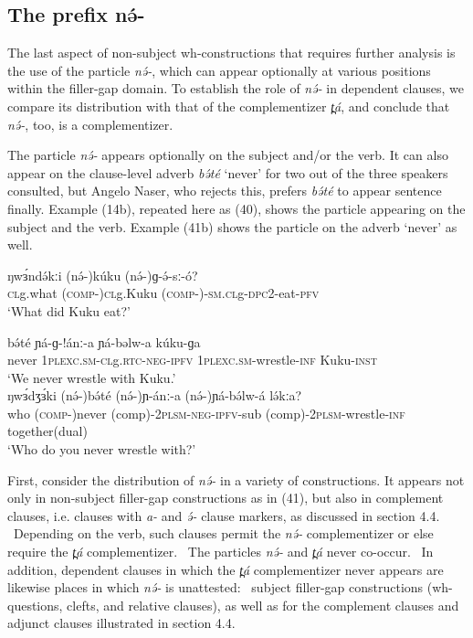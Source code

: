 \subsection{The prefix nə́-}
The last aspect of non-subject wh-constructions that requires further analysis is the use of the particle \textit{nə́-}, which can appear optionally at various positions within the filler-gap domain. To establish the role of \textit{nə́-} in dependent clauses, we compare its distribution with that of the complementizer \textit{t̪á}, and conclude that \textit{nə́-}, too, is a complementizer.

The particle \textit{nə́-} appears optionally on the subject and/or the verb. It can also appear on the clause-level adverb \textit{bə́té} ‘never’ for two out of the three speakers consulted, but Angelo Naser, who rejects this, prefers \textit{bə́té} to appear sentence finally. Example (14b), repeated here as (40), shows the particle appearing on the subject and the verb.  Example (41b) shows the particle on the adverb ‘never’ as well.

\ea
\gll	ŋwɜ́ndə́kːi	(nə́-)kúku	(nə́-)ɡ-ə́-sː-ó?\\
	\textsc{cl}g.what	(\textsc{comp-})\textsc{cl}g.Kuku	(\textsc{comp-})-\textsc{sm.cl}g-\textsc{dpc}2-eat-\textsc{pfv}	\\
\trans	‘What did Kuku eat?’\\
\z

\ea
\ea \gll	bə́té	ɲá-ɡ-!ánː-a	ɲá-bəlw-a          	kúku-ɡa\\
	never   1\textsc{plexc.sm}-\textsc{cl}g.\textsc{rtc}-\textsc{neg}-\textsc{ipfv} 1\textsc{plexc.sm}-wrestle-\textsc{inf}	Kuku-\textsc{inst}\\
\trans		‘We never wrestle with Kuku.’\\
\ex \gll	ŋwɜ́dʒɜ́ki	(nə́-)bə́té	(nə́-)ɲ-ánː-a	 (nə́-)ɲá-bə́lw-á	lə́kːa?  	   \\
		    	who	        (\textsc{comp-})never     (comp)-2\textsc{plsm}-\textsc{neg}-\textsc{ipfv}-sub	
			(comp)-2\textsc{plsm}-wrestle-\textsc{inf}	together(dual)\\
\trans		‘Who do you never wrestle with?’
\z
\z

First, consider the distribution of \textit{nə́-} in a variety of constructions. It appears not only in non-subject filler-gap constructions as in (41), but also in complement clauses, i.e. clauses with \textit{a-} and \textit{ə́-} clause markers, as discussed in section 4.4.  Depending on the verb, such clauses permit the \textit{nə́-} complementizer or else require the \textit{t̪á} complementizer.  The particles \textit{nə́-} and \textit{t̪á} never co-occur.  In addition, dependent clauses in which the \textit{t̪á} complementizer never appears are likewise places in which \textit{nə́-} is unattested:  subject filler-gap constructions (wh-questions, clefts, and relative clauses), as well as for the complement clauses and adjunct clauses illustrated in section 4.4. 

